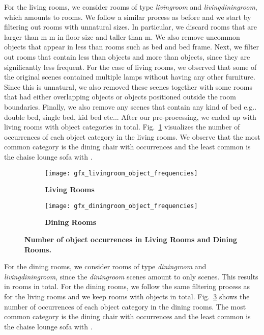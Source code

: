 \documentclass{article}
\makeatletter
\DeclareRobustCommand\onedot{\futurelet\@let@token\@onedot}
\def\@onedot{\ifx\@let@token.\else.\null\fi\xspace}
\def\eg{e.g\onedot} \def\Eg{E.g\onedot}
\def\etc{etc\onedot}
\newcommand{\boldparagraph}[1]{\vspace{0.2cm}\noindent{\bf #1:} }
\newcommand{\figref}[1]{Fig.~\ref{#1}}
\makeatother
\begin{document}
\boldparagraph{Living Room}For the living rooms, we consider rooms of type \emph{livingroom} and
\emph{livingdiningroom}, which amounts to  rooms. We follow a similar
process as before and we start by filtering out rooms with unnatural sizes.  In
particular, we discard rooms that are larger than m  m in floor
size and taller than m. We also remove uncommon objects that appear in less
than  rooms such as bed and bed frame. Next, we filter out rooms that
contain less than  objects and more than  objects, since they are
significantly less frequent. For the case of living rooms, we observed that
some of the original scenes contained multiple lamps without having any other
furniture. Since this is unnatural, we also removed these scenes together with
some rooms that had either overlapping objects or objects positioned outside
the room boundaries. Finally, we also remove any scenes that contain any kind
of bed \eg double bed, single bed, kid bed \etc.  After our pre-processing, we
ended up with  living rooms with  object categories in total.
\figref{fig:livingroom_object_frequencies} visualizes the number of occurrences
of each object category in the living rooms. We observe that the most common
category is the dining chair with  occurrences and the least common is
the chaise lounge sofa with .
\begin{figure}[t!]
    \begin{subfigure}[t]{0.5\textwidth}
        \centering
        \texttt{[image: gfx\_livingroom\_object\_frequencies]}
        \vspace{-1.2em}
        \caption{{\bf{Living Rooms}}}
        \label{fig:livingroom_object_frequencies}
    \end{subfigure}\begin{subfigure}[t]{0.5\textwidth}
        \centering
        \texttt{[image: gfx\_diningroom\_object\_frequencies]}
        \vspace{-1.2em}
        \caption{{\bf{Dining Rooms}}}
        \label{fig:diningroom_object_frequencies}
    \end{subfigure}
    \caption{\bf{Number of object occurrences in Living Rooms and Dining Rooms.}}
    \vspace{-1.2em}
\end{figure}

\boldparagraph{Dining Room}For the dining rooms, we consider rooms of type \emph{diningroom} and
\emph{livingdiningroom}, since the \emph{diningroom} scenes amount to only  scenes.
This results in  rooms in total. For the dining rooms,
we follow the same filtering process as for the living rooms and we keep
 rooms with  objects in total. \figref{fig:diningroom_object_frequencies}
shows the number of occurrences of each object category in the dining rooms.
The most common category is the dining chair with 
occurrences and the least common is the chaise lounge sofa with .
\end{document}

